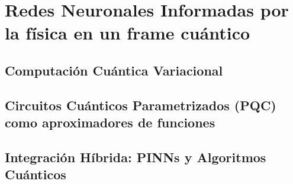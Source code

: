 \documentclass[0000.tex]{subfiles}
\begin{document}

\chapter{Redes Neuronales Informadas por la física en un frame cuántico}\label{ch:quantum}
\section{Computación Cuántica Variacional}
\section{Circuitos Cuánticos Parametrizados (PQC) como aproximadores de funciones}
\section{Integración Híbrida: PINNs y Algoritmos Cuánticos}

\ifSubfilesClassLoaded{}{}
\end{document}
